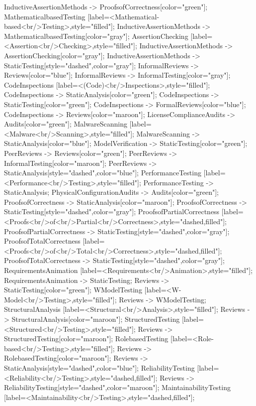 \documentclass{article}
\begin{document}
{InductiveAssertionMethods -> ProofsofCorrectness[color="green"];
MathematicalbasedTesting [label=<Mathematical-based<br/>Testing>,style="filled"];
InductiveAssertionMethods -> MathematicalbasedTesting[color="gray"];
AssertionChecking [label=<Assertion<br/>Checking>,style="filled"];
InductiveAssertionMethods -> AssertionChecking[color="gray"];
InductiveAssertionMethods -> StaticTesting[style="dashed",color="gray"];
InformalReviews -> Reviews[color="blue"];
InformalReviews -> InformalTesting[color="gray"];
CodeInspections [label=<(Code)<br/>Inspections>,style="filled"];
CodeInspections -> StaticAnalysis[color="green"];
CodeInspections -> StaticTesting[color="green"];
CodeInspections -> FormalReviews[color="blue"];
CodeInspections -> Reviews[color="maroon"];
LicenseComplianceAudits -> Audits[color="green"];
MalwareScanning [label=<Malware<br/>Scanning>,style="filled"];
MalwareScanning -> StaticAnalysis[color="blue"];
ModelVerification -> StaticTesting[color="green"];
PeerReviews -> Reviews[color="green"];
PeerReviews -> InformalTesting[color="maroon"];
PeerReviews -> StaticAnalysis[style="dashed",color="blue"];
PerformanceTesting [label=<Performance<br/>Testing>,style="filled"];
PerformanceTesting -> StaticAnalysis;
PhysicalConfigurationAudits -> Audits[color="green"];
ProofsofCorrectness -> StaticAnalysis[color="maroon"];
ProofsofCorrectness -> StaticTesting[style="dashed",color="gray"];
ProofsofPartialCorrectness [label=<Proofs<br/>of<br/>Partial<br/>Correctness>,style="dashed,filled"];
ProofsofPartialCorrectness -> StaticTesting[style="dashed",color="gray"];
ProofsofTotalCorrectness [label=<Proofs<br/>of<br/>Total<br/>Correctness>,style="dashed,filled"];
ProofsofTotalCorrectness -> StaticTesting[style="dashed",color="gray"];
RequirementsAnimation [label=<Requirements<br/>Animation>,style="filled"];
RequirementsAnimation -> StaticTesting;
Reviews -> StaticTesting[color="green"];
WModelTesting [label=<W-Model<br/>Testing>,style="filled"];
Reviews -> WModelTesting;
StructuralAnalysis [label=<Structural<br/>Analysis>,style="filled"];
Reviews -> StructuralAnalysis[color="maroon"];
StructuredTesting [label=<Structured<br/>Testing>,style="filled"];
Reviews -> StructuredTesting[color="maroon"];
RolebasedTesting [label=<Role-based<br/>Testing>,style="filled"];
Reviews -> RolebasedTesting[color="maroon"];
Reviews -> StaticAnalysis[style="dashed",color="blue"];
ReliabilityTesting [label=<Reliability<br/>Testing>,style="dashed,filled"];
Reviews -> ReliabilityTesting[style="dashed",color="maroon"];
MaintainabilityTesting [label=<Maintainability<br/>Testing>,style="dashed,filled"];
}
\end{document}
